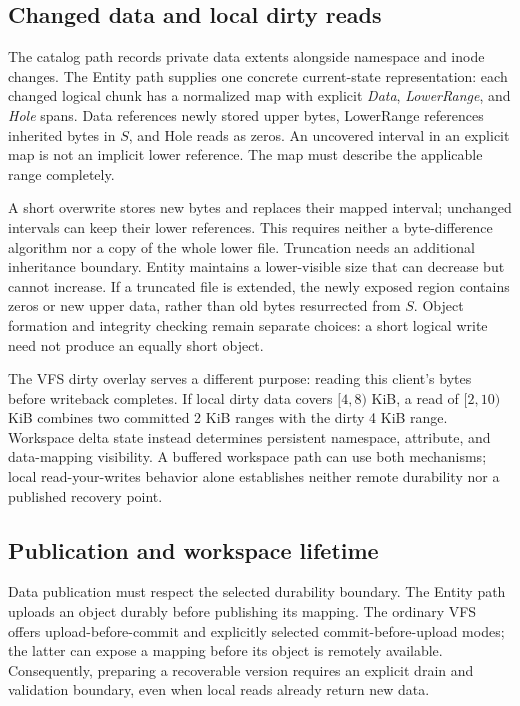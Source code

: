 \subsection{Changed data and local dirty reads}

The catalog path records private data extents alongside namespace and inode
changes. The Entity path supplies one concrete current-state representation:
each changed logical chunk has a normalized map with explicit \emph{Data},
\emph{LowerRange}, and \emph{Hole} spans. Data references newly stored upper
bytes, LowerRange references inherited bytes in $S$, and Hole reads as zeros.
An uncovered interval in an explicit map is not an implicit lower reference.
The map must describe the applicable range completely.

A short overwrite stores new bytes and replaces their mapped interval;
unchanged intervals can keep their lower references. This requires neither a
byte-difference algorithm nor a copy of the whole lower file. Truncation needs
an additional inheritance boundary. Entity maintains a lower-visible size
that can decrease but cannot increase. If a truncated file is extended, the
newly exposed region contains zeros or new upper data, rather than old bytes
resurrected from $S$. Object formation and integrity checking remain separate
choices: a short logical write need not produce an equally short object.

The VFS dirty overlay serves a different purpose: reading this client's bytes
before writeback completes. If local dirty data covers $[4,8)$ KiB, a read of
$[2,10)$ KiB combines two committed 2 KiB ranges with the dirty 4 KiB range.
Workspace delta state instead determines persistent namespace, attribute, and
data-mapping visibility. A buffered workspace path can use both mechanisms;
local read-your-writes behavior alone establishes neither remote durability
nor a published recovery point.

\subsection{Publication and workspace lifetime}

Data publication must respect the selected durability boundary. The Entity
path uploads an object durably before publishing its mapping. The ordinary
VFS offers upload-before-commit and explicitly selected commit-before-upload
modes; the latter can expose a mapping before its object is remotely
available. Consequently, preparing a recoverable version requires an explicit
drain and validation boundary, even when local reads already return new data.

